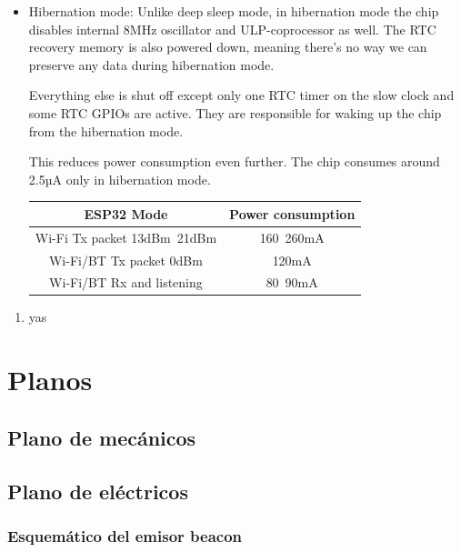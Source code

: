 \documentclass[a4paper ,12pt, onecolumn]{article}
\begin{document}
\begin{itemize}
                \item Hibernation mode: Unlike deep sleep mode, in hibernation mode the chip disables internal 8MHz oscillator and ULP-coprocessor as well. The RTC recovery memory is also powered down, meaning there’s no way we can preserve any data during hibernation mode.
            
                Everything else is shut off except only one RTC timer on the slow clock and some RTC GPIOs are active. They are responsible for waking up the chip from the hibernation mode.
                
                This reduces power consumption even further. The chip consumes around 2.5µA only in hibernation mode.
            
                \begin{center}
                    \begin{tabular}{||c | c ||} 
                    \hline
                    ESP32 Mode & Power consumption  \\ [0.5ex] 
                    \hline\hline
                    Wi-Fi Tx packet 13dBm~21dBm & 160~260mA  \\ 
                    \hline
                    Wi-Fi/BT Tx packet 0dBm	 & 120mA  \\
                    \hline
                    Wi-Fi/BT Rx and listening & 80~90mA  \\
                    \hline
                \end{tabular}
                \end{center}
            \end{itemize}
            \begin{enumerate}
                \item  yas
            \end{enumerate}


\section{Planos}
    \subsection{Plano de mecánicos}
    \subsection{Plano de eléctricos}
        \subsubsection{Esquemático del emisor beacon}
\end{document}
